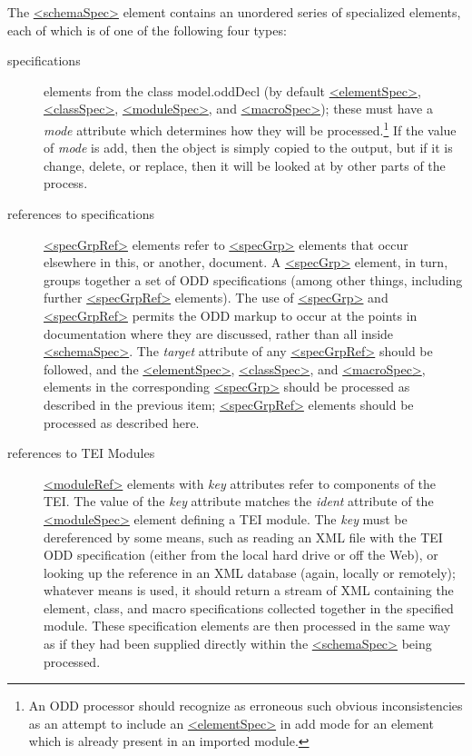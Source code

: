 The \hyperref[TEI.schemaSpec]{<schemaSpec>} element contains an unordered series of specialized elements, each of which is of one of the following four types: \begin{description}

\item[{specifications}]elements from the class \textsf{model.oddDecl} (by default \hyperref[TEI.elementSpec]{<elementSpec>}, \hyperref[TEI.classSpec]{<classSpec>}, \hyperref[TEI.moduleSpec]{<moduleSpec>}, and \hyperref[TEI.macroSpec]{<macroSpec>}); these must have a {\itshape mode} attribute which determines how they will be processed.\footnote{An ODD processor should recognize as erroneous such obvious inconsistencies as an attempt to include an \hyperref[TEI.elementSpec]{<elementSpec>} in add mode for an element which is already present in an imported module.} If the value of {\itshape mode} is add, then the object is simply copied to the output, but if it is change, delete, or replace, then it will be looked at by other parts of the process.
\item[{references to specifications}]\hyperref[TEI.specGrpRef]{<specGrpRef>} elements refer to \hyperref[TEI.specGrp]{<specGrp>} elements that occur elsewhere in this, or another, document. A \hyperref[TEI.specGrp]{<specGrp>} element, in turn, groups together a set of ODD specifications (among other things, including further \hyperref[TEI.specGrpRef]{<specGrpRef>} elements). The use of \hyperref[TEI.specGrp]{<specGrp>} and \hyperref[TEI.specGrpRef]{<specGrpRef>} permits the ODD markup to occur at the points in documentation where they are discussed, rather than all inside \hyperref[TEI.schemaSpec]{<schemaSpec>}. The {\itshape target} attribute of any \hyperref[TEI.specGrpRef]{<specGrpRef>} should be followed, and the \hyperref[TEI.elementSpec]{<elementSpec>}, \hyperref[TEI.classSpec]{<classSpec>}, and \hyperref[TEI.macroSpec]{<macroSpec>}, elements in the corresponding \hyperref[TEI.specGrp]{<specGrp>} should be processed as described in the previous item; \hyperref[TEI.specGrpRef]{<specGrpRef>} elements should be processed as described here.
\item[{references to TEI Modules}]\hyperref[TEI.moduleRef]{<moduleRef>} elements with {\itshape key} attributes refer to components of the TEI. The value of the {\itshape key} attribute matches the {\itshape ident} attribute of the \hyperref[TEI.moduleSpec]{<moduleSpec>} element defining a TEI module. The {\itshape key} must be dereferenced by some means, such as reading an XML file with the TEI ODD specification (either from the local hard drive or off the Web), or looking up the reference in an XML database (again, locally or remotely); whatever means is used, it should return a stream of XML containing the element, class, and macro specifications collected together in the specified module. These specification elements are then processed in the same way as if they had been supplied directly within the \hyperref[TEI.schemaSpec]{<schemaSpec>} being processed.

\end{description}
